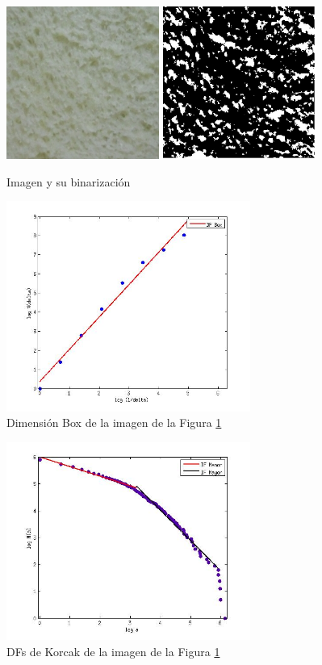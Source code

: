 \begin{figure}
\centering
\includegraphics[width=5cm]{figures/lactal}
\includegraphics[width=5cm]{figures/lactalBin}
\caption{Imagen y su binarizaci\'on}
\label{bin}
\end{figure}



\begin{figure}
\centering
\includegraphics[width=8cm]{figures/fitbox}
\caption{Dimensi\'on Box de la imagen de la Figura \ref{bin}}
\label{fitbox}
\end{figure}


\begin{figure}
\centering
\includegraphics[width=8cm]{figures/lactal1PlotKorcak}
\caption{DFs de Korcak de la imagen de la Figura \ref{bin}}
\label{fit}
\end{figure}


